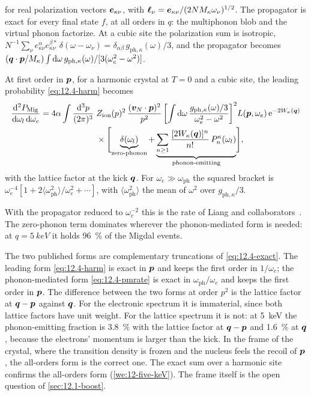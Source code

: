 for real polarization vectors $\bm{e}_{\kappa\nu}$, with $\bm{\ell}_\nu = \bm{e}_{\kappa\nu}/(2NM_\kappa\omega_\nu)^{1/2}$. The propagator is exact for every final state $f$, at all orders in $q$: the multiphonon blob and the virtual phonon factorize. At a cubic site the polarization sum is isotropic, $N^{-1}\sum_\nu e^\alpha_{\kappa\nu}e^{\beta*}_{\kappa\nu}\,\delta(\omega - \omega_\nu) = \delta_{\alpha\beta}\,g_{\mathrm{ph},\kappa}(\omega)/3$, and the propagator becomes $(\bm{q}\cdot\bm{p}/M_\kappa)\int\mathrm{d}\omega\,g_{\mathrm{ph},\kappa}(\omega)/[3(\omega_e^2 - \omega^2)]$.
\begin{keyresult}
At first order in $\bm{p}$, for a harmonic crystal at $T = 0$ and a cubic site, the leading probability \cref{eq:12.4-harm} becomes
\begin{equation}
  \begin{split}
  \frac{\mathrm{d}^2P_{\mathrm{Mig}}}{\mathrm{d}\omega_l\,\mathrm{d}\omega_e} = 4\alpha\int\frac{\mathrm{d}^3p}{(2\pi)^3}\;&Z_{\mathrm{ion}}(p)^2\,\frac{(\bm{v}_N\cdot\bm{p})^2}{p^2}\,\biggl[\int\mathrm{d}\omega\,\frac{g_{\mathrm{ph},\kappa}(\omega)/3}{\omega_e^2 - \omega^2}\biggr]^2L(\bm{p},\omega_e)\,\mathrm{e}^{-2W_\kappa(\bm{q})} \\
  &\times\Biggl[\underbrace{\delta(\omega_l)}_{\text{zero-phonon}} + \underbrace{\sum_{n\ge1}\frac{[2W_\kappa(\bm{q})]^n}{n!}\,P^\kappa_n(\omega_l)}_{\text{phonon-emitting}}\Biggr] ,
  \end{split}
  \label{eq:12.4-pmrate}
\end{equation}
with the lattice factor at the kick $\bm{q}$. For $\omega_e \gg \omega_{\mathrm{ph}}$ the squared bracket is $\omega_e^{-4}[1 + 2\langle\omega_{\mathrm{ph}}^2\rangle/\omega_e^2 + \cdots]$, with $\langle\omega_{\mathrm{ph}}^2\rangle$ the mean of $\omega^2$ over $g_{\mathrm{ph},\kappa}/3$.
\end{keyresult}
\noindent With the propagator reduced to $\omega_e^{-2}$ this is the rate of Liang and collaborators~\cite[Eqs.~(3.3), (3.4)]{liang2022phonon}. The zero-phonon term dominates wherever the phonon-mediated form is needed: at $q = \SI{5}{keV}$ it holds \SI{96}{\percent} of the Migdal events.

The two published forms are complementary truncations of \cref{eq:12.4-exact}. The leading form \cref{eq:12.4-harm} is exact in $\bm{p}$ and keeps the first order in $1/\omega_e$; the phonon-mediated form \cref{eq:12.4-pmrate} is exact in $\omega_{\mathrm{ph}}/\omega_e$ and keeps the first order in $\bm{p}$. The difference between the two forms at order $p^2$ is the lattice factor at $\bm{q} - \bm{p}$ against $\bm{q}$. For the electronic spectrum it is immaterial, since both lattice factors have unit weight. For the lattice spectrum it is not: at \SI{5}{keV} the phonon-emitting fraction is \SI{3.8}{\percent} with the lattice factor at $\bm{q} - \bm{p}$ and \SI{1.6}{\percent} at $\bm{q}$, because the electrons' momentum is larger than the kick. In the frame of the crystal, where the transition density is frozen and the nucleus feels the recoil of $\bm{p}$, the all-orders form is the correct one. The exact sum over a harmonic site confirms the all-orders form (\cref{we:12-five-keV}). The frame itself is the open question of \cref{sec:12.1-boost}.

